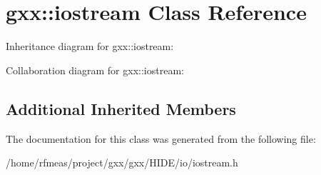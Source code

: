 \hypertarget{classgxx_1_1iostream}{}\section{gxx\+:\+:iostream Class Reference}
\label{classgxx_1_1iostream}


Inheritance diagram for gxx\+:\+:iostream\+:


Collaboration diagram for gxx\+:\+:iostream\+:
\subsection*{Additional Inherited Members}


The documentation for this class was generated from the following file\+:\begin{DoxyCompactItemize}
\item 
/home/rfmeas/project/gxx/gxx/\+H\+I\+D\+E/io/iostream.\+h\end{DoxyCompactItemize}
